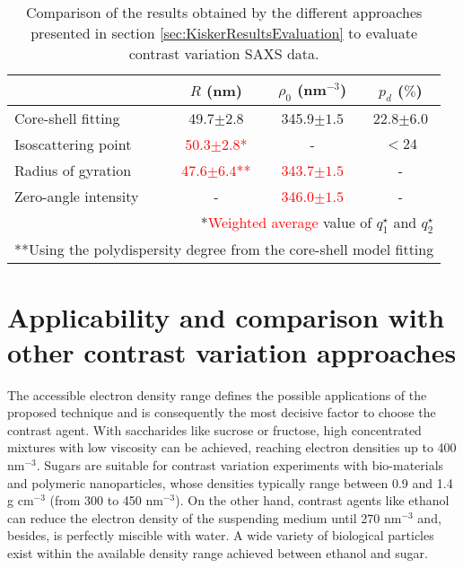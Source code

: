 \begin{table*}
\caption[Comparison of the results obtained by different evaluation approaches to contrast variation SAXS data.]{Comparison of the results obtained by the different approaches presented in section \ref{sec:KiskerResultsEvaluation} to evaluate contrast variation SAXS data.}
\begin{tabular}{l|ccc}
 & \( R\) (nm)    & \(\rho_0\) (nm\(^{-3}\)) & \(p_d\) (\(\%\))\\
\hline
 Core-shell fitting &  49.7\(\pm 2.8\)   &     345.9\(\pm 1.5\)      & 22.8\(\pm 6.0\) \\
 Isoscattering point &  \textcolor{red}{50.3\(\pm 2.8\)*} &     -          & $<24$  \\
 Radius of gyration &  \textcolor{red}{47.6\(\pm 6.4\)**}      &     \textcolor{red}{343.7\(\pm 1.5\)}      & -    \\
 Zero-angle intensity &  -    &     \textcolor{red}{346.0\(\pm 1.5\)}      & -    \\ \hline
\multicolumn{4}{r}{*\textcolor{red}{Weighted average} value of \(q^{\star}_1\) and \(q^{\star}_2\)}\\  
\multicolumn{4}{r}{**Using the polydispersity degree from the core-shell model fitting}\\ 
\end{tabular}
\label{tab:comparison_results_Kisker}
\end{table*}

\section{Applicability and comparison with other contrast variation approaches}
\label{sec:applicability}

The accessible electron density range defines the possible applications of the proposed technique and is consequently the most decisive factor to choose the contrast agent. With saccharides like sucrose or fructose, high concentrated mixtures with low viscosity can be achieved, reaching electron densities up to 400 nm$^{-3}$. Sugars are suitable for contrast variation experiments with bio-materials and polymeric nanoparticles, whose densities typically range between 0.9 and 1.4 g cm$^{-3}$ (from 300 to 450 nm$^{-3}$). On the other hand, contrast agents like ethanol can reduce the electron density of the suspending medium until 270 nm$^{-3}$ and, besides, is perfectly miscible with water. A wide variety of biological particles exist within the available density range achieved between ethanol and sugar.

